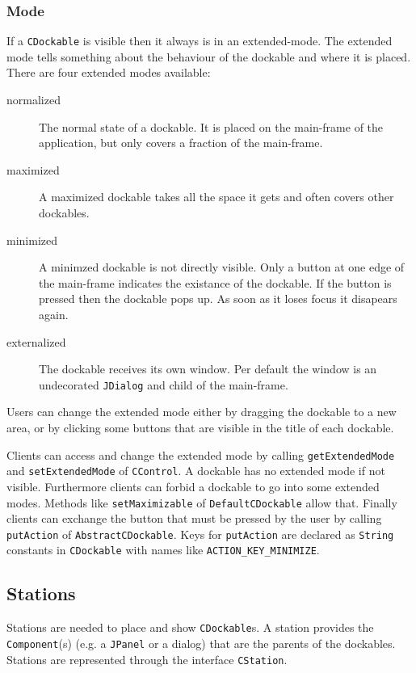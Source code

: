 \documentclass[a4paper,10pt]{article}
\newcommand{\src}[1]{\texttt{#1}}
\begin{document}
\subsubsection{Mode}
If a \src{CDockable} is visible then it always is in an extended-mode. The extended mode tells something about the behaviour of the dockable and where it is placed. There are four extended modes available:
\begin{description}
 \item[normalized] The normal state of a dockable. It is placed on the main-frame of the application, but only covers a fraction of the main-frame.
 \item[maximized] A maximized dockable takes all the space it gets and often covers other dockables.
 \item[minimized] A minimzed dockable is not directly visible. Only a button at one edge of the main-frame indicates the existance of the dockable. If the button is pressed then the dockable pops up. As soon as it loses focus it disapears again.
 \item[externalized] The dockable receives its own window. Per default the window is an undecorated \src{JDialog} and child of the main-frame.
\end{description}

Users can change the extended mode either by dragging the dockable to a new area, or by clicking some buttons that are visible in the title of each dockable.

Clients can access and change the extended mode by calling \linebreak \src{getExtendedMode} and \src{setExtendedMode} of \src{CControl}. A dockable has no extended mode if not visible. Furthermore clients can forbid a dockable to go into some extended modes. Methods like \src{setMaximizable} of \src{DefaultCDockable} allow that. Finally clients can exchange the button that must be pressed by the user by calling \src{putAction} of \src{AbstractCDockable}. Keys for \src{putAction} are declared as \src{String} constants in \src{CDockable} with names like \src{ACTION\_KEY\_MINIMIZE}.

\subsection{Stations}
Stations are needed to place and show \src{CDockable}s. A station provides the \src{Component}(s) (e.g. a \src{JPanel} or a dialog) that are the parents of the dockables. Stations are represented through the interface \src{CStation}.
\end{document}
